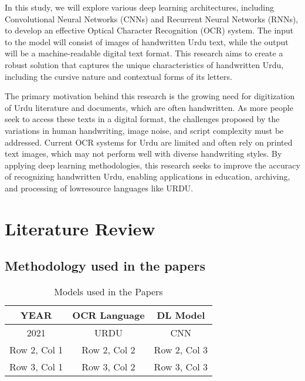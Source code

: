 \documentclass[9pt,twocolumn,twoside]{article} %
\begin{document}
In this study, we will explore various deep learning architectures, including Convolutional Neural Networks (CNNs) and Recurrent Neural Networks (RNNs), to develop an effective Optical Character Recognition (OCR) system. The input to the model will consist of images of handwritten Urdu text, while the output will be a machine-readable digital text format. This research aims to create a robust solution that captures the unique characteristics of handwritten Urdu, including the cursive nature and contextual forms of its letters.

The primary motivation behind this research is the growing need for digitization of Urdu literature and documents, which are often handwritten. As more people seek to access these texts in a digital format, the challenges proposed by the variations in human handwriting, image noise, and script complexity must be addressed. Current OCR systems for Urdu are limited and often rely on printed text images, which may not perform well with diverse handwriting styles.
By applying deep learning methodologies, this research seeks to improve the accuracy of recognizing handwritten Urdu, enabling applications in education, archiving, and processing of lowresource languages like URDU. 

\section{Literature Review}	


\subsection{Methodology used in the papers}
    \renewcommand{\tablename}{Table}
    \begin{table}[ht]
    \centering
    \caption{Models used in the Papers}
    \begin{tabular}{ccc} %
        \toprule
        YEAR & OCR Language & DL Model \\ %
        \midrule
        2021 \cite{mushtaq21} & URDU & CNN \\ %
        Row 2, Col 1 & Row 2, Col 2 & Row 2, Col 3 \\ %
        Row 3, Col 1 & Row 3, Col 2 & Row 3, Col 3 \\ %
        \bottomrule
    \end{tabular}
    \label{}
    \end{table}
\end{document}

